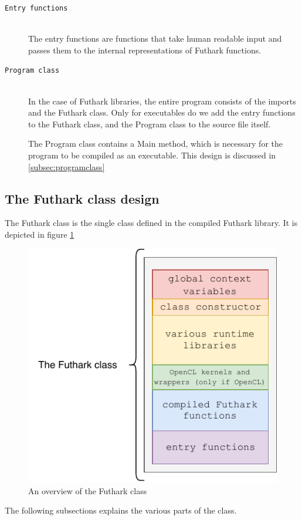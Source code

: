 \begin{description}
\begin{description}
\item[\texttt{Entry functions}] \hfill \\
  The entry functions are functions that take human readable input and passes
  them to the internal representations of Futhark functions.
\item[\texttt{Program class}] \hfill \\
  In the case of Futhark libraries, the entire \csharp{} program consists
  of the imports and the Futhark class. Only for executables do we add the entry
  functions to the Futhark class, and the Program class to the \csharp{} source
  file itself.
 
  The Program class contains a Main method, which is necessary for the \csharp{}
  program to be compiled as an executable. This design is discussed in \ref{subsec:programclass}
\end{description}

\subsection{The Futhark class design}
\label{subsec:futharkclass}
The Futhark class is the single class defined in the compiled Futhark library.
It is depicted in figure \ref{fig:futharkclass}
\begin{figure}[h]
  \centering
  \includegraphics{chapters/figs/csharp/futhark_class.pdf}
  \caption{An overview of the Futhark class}
  \label{fig:futharkclass}
\end{figure}
The following subsections explains the various parts of the class.


\end{description}
